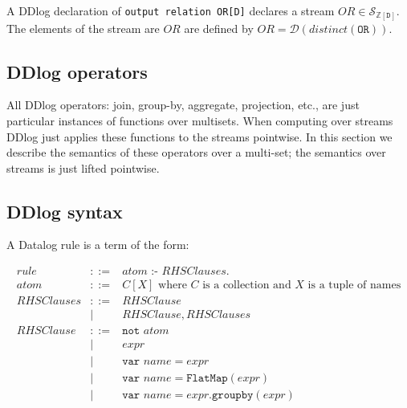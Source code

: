 \documentclass[10pt]{article}
\newcommand{\code}[1]{\texttt{#1}}
\newcommand{\Z}{\mathbb{Z}}  %
\newcommand{\stream}[1]{\ensuremath{\mathcal{S}_{#1}}}
\newcommand{\D}{\mathcal{D}}  %
\newcommand{\distinct}{\mathit{distinct}}  %
\begin{document}
A DDlog declaration of \code{output relation OR[D]} declares a stream
$OR \in \stream{\Z[\code{D}]}$.  The elements of the stream are $OR$ are defined
by $OR = \D(\distinct(\code{OR}))$.

\subsection{DDlog operators}

All DDlog operators: join, group-by, aggregate, projection, etc., are
just particular instances of functions over multisets.  When computing
over streams DDlog just applies these functions to the streams
pointwise.  In this section we describe the semantics of these
operators over a multi-set; the semantics over streams is just lifted
pointwise.

\subsection{DDlog syntax}

A Datalog rule is a term of the form:

\begin{eqnarray*}
  rule &::=& atom \code{ :- } \mathit{RHSClauses}. \\
  atom &::=& C[X] \mbox{ where $C$ is a collection and $X$ is a tuple
    of names} \\
  \mathit{RHSClauses} &::=& \mathit{RHSClause} \\
  &|& \mathit{RHSClause}, \mathit{RHSClauses} \\
  \mathit{RHSClause} &::=& \code{not } atom \\
  &|& expr   \\
  &|& \code{var } name = expr \\
  &|& \code{var } name = \code{FlatMap}( expr ) \\
  &|& \code{var } name = expr \code{.groupby}( expr ) \\
\end{eqnarray*}



\end{document}
